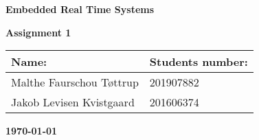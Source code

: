\thispagestyle{empty}
\centerline{\fontsize{60}{70}\selectfont\textbf{Embedded Real Time Systems}}
\vspace{10mm}
\vspace{40mm}
\centerline{\Huge\textbf{Assignment 1}}
\vspace{40mm}

\begin{table}[htb]
\fontsize{16}{30}\selectfont
\centering
\begin{tabular}{| p{85mm} | p{60 mm} |}
\hline
\textbf{Name:}                      &  \textbf{Students number:}     \\ \hline
Malthe Faurschou Tøttrup            &  201907882                     \\ \hline
Jakob Levisen Kvistgaard            &  201606374                     \\ \hline
\end{tabular}
\end{table}

\vspace{10mm}
\vspace{20mm}

\centerline{\large\textbf{\today}}
\centerline{\large\textbf{ }}


